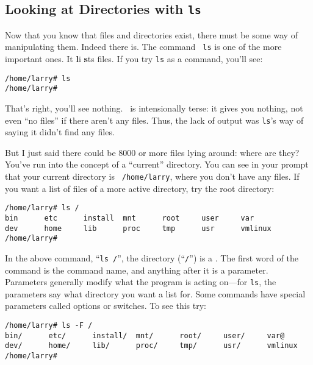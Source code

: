 \subsection{Looking at Directories with {\tt ls}}

Now that you know that files and directories exist, there must be some
way of manipulating them.  Indeed there is.  The command {\tt
  ls} is one of the more important ones. It {\bf l}i{\bf
  s}ts files.  If you try {\tt ls} as a command, you'll see:

\begin{screen}\begin{verbatim}
/home/larry# ls
/home/larry#
\end{verbatim}\end{screen}

That's right, you'll see nothing. \unix\ is intensionally terse: it
gives you nothing, not even ``no files'' if there aren't any files.
Thus, the lack of output was {\tt ls}'s way of saying it didn't find
any files.

But I just said there could be 8000 or more files lying around: where
are they? You've run into the concept of a ``current'' directory. You
can see in your prompt that your current directory is {\tt
  /home/larry}, where you don't have any files.  If you want a list of
files of a more active directory, try the root directory:

\begin{screen}\begin{verbatim}
/home/larry# ls /
bin      etc      install  mnt      root     user     var
dev      home     lib      proc     tmp      usr      vmlinux
/home/larry# 
\end{verbatim}
\end{screen}

In the above command, ``{\tt ls /}'', the directory (``{\tt /}'') is a
. The first word of the command is the command
name, and anything after it is a parameter.  Parameters generally
modify what the program is acting on---for {\tt ls}, the parameters
say what directory you want a list for.  Some commands have special
parameters called options or switches. To see this try:

\begin{screen}\begin{verbatim}
/home/larry# ls -F /
bin/      etc/      install/  mnt/      root/     user/     var@
dev/      home/     lib/      proc/     tmp/      usr/      vmlinux
/home/larry# 
\end{verbatim}
\end{screen}

